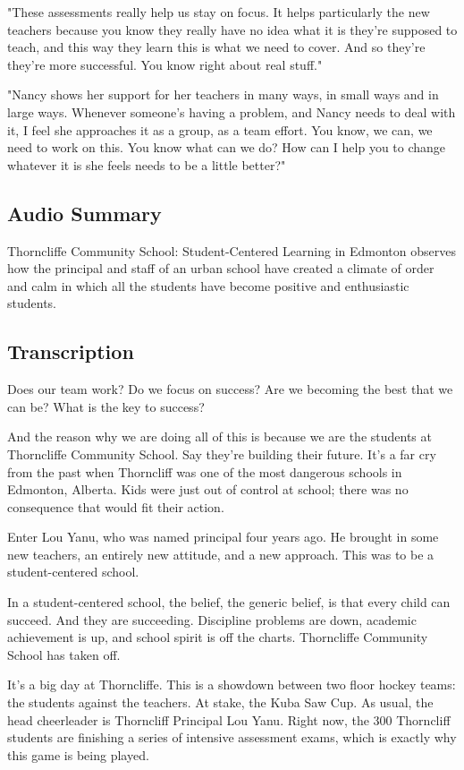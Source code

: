 "These assessments really help us stay on focus. It helps particularly the new teachers because you know they really have no idea what it is they're supposed to teach, and this way they learn this is what we need to cover. And so they're they're more successful. You know right about real stuff."

"Nancy shows her support for her teachers in many ways, in small ways and in large ways. Whenever someone's having a problem, and Nancy needs to deal with it, I feel she approaches it as a group, as a team effort. You know, we can, we need to work on this. You know what can we do? How can I help you to change whatever it is she feels needs to be a little better?"

\subsection{Audio Summary}

Thorncliffe Community School: Student-Centered Learning in Edmonton observes how the principal and staff of an urban school have created a climate of order and calm in which all the students have become positive and enthusiastic students.

\subsection{Transcription}

Does our team work? Do we focus on success? Are we becoming the best that we can be? What is the key to success?

And the reason why we are doing all of this is because we are the students at Thorncliffe Community School. Say they're building their future. It's a far cry from the past when Thorncliff was one of the most dangerous schools in Edmonton, Alberta. Kids were just out of control at school; there was no consequence that would fit their action.

Enter Lou Yanu, who was named principal four years ago. He brought in some new teachers, an entirely new attitude, and a new approach. This was to be a student-centered school.

In a student-centered school, the belief, the generic belief, is that every child can succeed. And they are succeeding. Discipline problems are down, academic achievement is up, and school spirit is off the charts. Thorncliffe Community School has taken off.

It's a big day at Thorncliffe. This is a showdown between two floor hockey teams: the students against the teachers. At stake, the Kuba Saw Cup. As usual, the head cheerleader is Thorncliff Principal Lou Yanu. Right now, the 300 Thorncliff students are finishing a series of intensive assessment exams, which is exactly why this game is being played.

